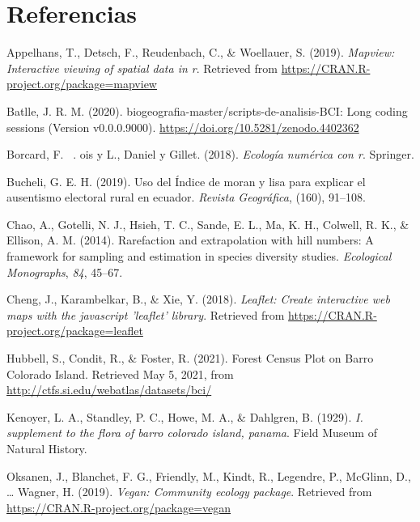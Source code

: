 \documentclass[11pt,]{article}
\begin{document}
\section*{Referencias}\label{referencias}

\hypertarget{refs}{}
\hypertarget{ref-mapview}{}
Appelhans, T., Detsch, F., Reudenbach, C., \& Woellauer, S. (2019).
\emph{Mapview: Interactive viewing of spatial data in r}. Retrieved from
\url{https://CRAN.R-project.org/package=mapview}

\hypertarget{ref-jose_ramon_martinez_batlle_2020_4402362}{}
Batlle, J. R. M. (2020). biogeografia-master/scripts-de-analisis-BCI:
Long coding sessions (Version v0.0.0.9000).
\url{https://doi.org/10.5281/zenodo.4402362}

\hypertarget{ref-borcard2018numerical}{}
Borcard, F. ~. ois y L., Daniel y Gillet. (2018). \emph{Ecología
numérica con r}. Springer.

\hypertarget{ref-bucheli2019uso}{}
Bucheli, G. E. H. (2019). Uso del Índice de moran y lisa para explicar
el ausentismo electoral rural en ecuador. \emph{Revista Geográfica},
(160), 91--108.

\hypertarget{ref-paqueteiNEXT}{}
Chao, A., Gotelli, N. J., Hsieh, T. C., Sande, E. L., Ma, K. H.,
Colwell, R. K., \& Ellison, A. M. (2014). Rarefaction and extrapolation
with hill numbers: A framework for sampling and estimation in species
diversity studies. \emph{Ecological Monographs}, \emph{84}, 45--67.

\hypertarget{ref-leaflet}{}
Cheng, J., Karambelkar, B., \& Xie, Y. (2018). \emph{Leaflet: Create
interactive web maps with the javascript 'leaflet' library}. Retrieved
from \url{https://CRAN.R-project.org/package=leaflet}

\hypertarget{ref-webcenso}{}
Hubbell, S., Condit, R., \& Foster, R. (2021). Forest Census Plot on
Barro Colorado Island. Retrieved May 5, 2021, from
\url{http://ctfs.si.edu/webatlas/datasets/bci/}

\hypertarget{ref-kenoyer1929supplement}{}
Kenoyer, L. A., Standley, P. C., Howe, M. A., \& Dahlgren, B. (1929).
\emph{I. supplement to the flora of barro colorado island, panama}.
Field Museum of Natural History.

\hypertarget{ref-vegan}{}
Oksanen, J., Blanchet, F. G., Friendly, M., Kindt, R., Legendre, P.,
McGlinn, D., \ldots{} Wagner, H. (2019). \emph{Vegan: Community ecology
package}. Retrieved from \url{https://CRAN.R-project.org/package=vegan}
\end{document}
